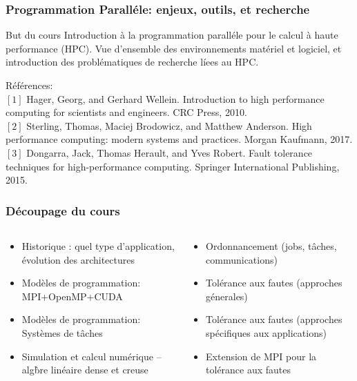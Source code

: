 \documentclass[compress,aspectratio=169]{beamer}
\begin{document}
\begin{frame}
  \frametitle{Programmation Parall\'ele: enjeux, outils, et recherche}

  \begin{beamerboxesrounded}{But du cours}
    Introduction \`a la programmation parall\'ele pour le calcul \`a haute performance (HPC). Vue d'ensemble des environnements mat\'eriel et logiciel, et introduction des probl\'ematiques de recherche l\'iees au HPC.
  \end{beamerboxesrounded}

  \bigskip
  
  \small R\'ef\'erences:\\
  $[1]$ Hager, Georg, and Gerhard Wellein. Introduction to high performance computing for scientists and engineers. CRC Press, 2010.\\
  $[2]$ Sterling, Thomas, Maciej Brodowicz, and Matthew Anderson. High performance computing: modern systems and practices. Morgan Kaufmann, 2017.\\
  $[3]$ Dongarra, Jack, Thomas Herault, and Yves Robert. Fault tolerance techniques for high-performance computing. Springer International Publishing, 2015.
  
\end{frame}

\begin{frame}
  \frametitle{D\'ecoupage du cours}
  \begin{columns}
    \begin{column}{.45\linewidth}
      \begin{itemize}
      \item Historique : quel type d'application, \'evolution des architectures
      \item Mod\`eles de programmation: MPI+OpenMP+CUDA
      \item Mod\`eles de programmation: Syst\`emes de t\^aches
      \item Simulation et calcul num\'erique -- alg\`bre lin\'eaire dense et creuse
      \end{itemize}
    \end{column}\begin{column}{.45\linewidth}
      \begin{itemize}
      \item Ordonnancement (jobs, t\^aches, communications)
      \item Tol\'erance aux fautes (approches g\'enerales)
      \item Tol\'erance aux fautes (approches sp\'ecifiques aux applications)
      \item Extension de MPI pour la tol\'erance aux fautes
      \end{itemize}
    \end{column}
  \end{columns}
\end{frame}
\end{document}
